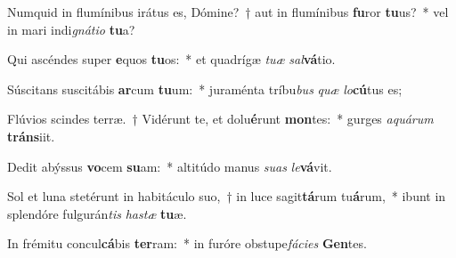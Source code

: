 \item Numquid in flumínibus irátus es, Dómine?~† aut in flumínibus \textbf{fu}ror \textbf{tu}us?~* vel in mari indi\textit{gná}\textit{ti}\textit{o} \textbf{tu}a?
\item Qui ascéndes super \textbf{e}quos \textbf{tu}os:~* et quadrígæ \textit{tu}\textit{æ} \textit{sal}\textbf{vá}tio.
\item Súscitans suscitábis \textbf{ar}cum \textbf{tu}um:~* juraménta tríbu\textit{bus} \textit{quæ} \textit{lo}\textbf{cú}tus es;
\item Flúvios scindes terræ.~† Vidérunt te, et dolu\textbf{é}runt \textbf{mon}tes:~* gurges \textit{a}\textit{quá}\textit{rum} \textbf{tráns}iit.
\item Dedit abýssus \textbf{vo}cem \textbf{su}am:~* altitúdo manus \textit{su}\textit{as} \textit{le}\textbf{vá}vit.
\item Sol et luna stetérunt in habitáculo suo,~† in luce sagit\textbf{tá}rum tu\textbf{á}rum,~* ibunt in splendóre fulgurán\textit{tis} \textit{has}\textit{tæ} \textbf{tu}æ.
\item In frémitu concul\textbf{cá}bis \textbf{ter}ram:~* in furóre obstupe\textit{fá}\textit{ci}\textit{es} \textbf{Gen}tes.
